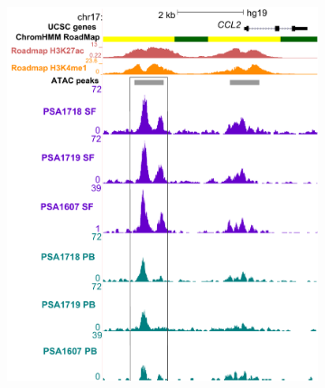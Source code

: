 \begin{figure}[H]
\centering
\begin{subfigure}[b]{0.45\textwidth}
\centering 
\includegraphics[width=\textwidth]{./Results3/pdfs/ATAC_PSA_CD14_UCSC_CCL2_track}%
\caption{}
\end{subfigure}%
~
\begin{subfigure}[b]{0.45\textwidth}
\centering 

\end{subfigure}
\end{figure}
